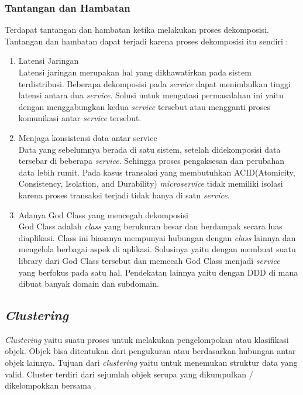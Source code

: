\subsubsection{Tantangan dan Hambatan}
Terdapat tantangan dan hambatan ketika melakukan proses dekomposisi. Tantangan dan hambatan dapat terjadi karena proses dekomposisi itu sendiri \cite{1C7}:
\begin{enumerate}[leftmargin=1.3cm]
	\item Latensi Jaringan\\
		  Latensi jaringan merupakan hal yang dikhawatirkan pada sistem terdistribusi. Beberapa dekomposisi pada \textit{service} dapat menimbulkan tinggi latensi antara dua \textit{service}. Solusi untuk mengatasi permasalahan ini yaitu dengan menggabungkan kedua \textit{service} tersebut atau mengganti proses komunikasi antar \textit{service} tersebut.
	\item Menjaga konsistensi data antar service\\
		  Data yang sebelumnya berada di satu sistem, setelah didekomposisi data tersebar di beberapa \textit{service}. Sehingga proses pengaksesan dan perubahan data lebih rumit. Pada kasus transaksi yang membutuhkan ACID(Atomicity, Consistency, Isolation, and Durability) \textit{microservice} tidak memiliki isolasi karena proses transaksi terjadi tidak hanya di satu \textit{service}.
	\item Adanya God Class yang mencegah dekomposisi\\
		  God Class adalah \textit{class} yang berukuran besar dan berdampak secara luas diaplikasi. Class ini biasanya mempunyai hubungan dengan \textit{class} lainnya dan mengelola berbagai aspek di aplikasi. Solusinya yaitu dengan membuat suatu library dari God Class tersebut dan memecah God Class menjadi \textit{service} yang berfokus pada satu hal. Pendekatan lainnya yaitu dengan DDD di mana dibuat banyak domain dan subdomain.\\
\end{enumerate}	

\subsection{\textit{Clustering}}
\textit{Clustering} yaitu suatu proses untuk melakukan pengelompokan atau klasifikasi objek. Objek bisa ditentukan dari pengukuran atau berdasarkan hubungan antar objek lainnya. Tujuan dari \textit{clustering} yaitu untuk  menemukan struktur data yang valid. Cluster terdiri dari sejumlah objek serupa yang dikumpulkan / dikelompokkan bersama \cite{2C9}.

